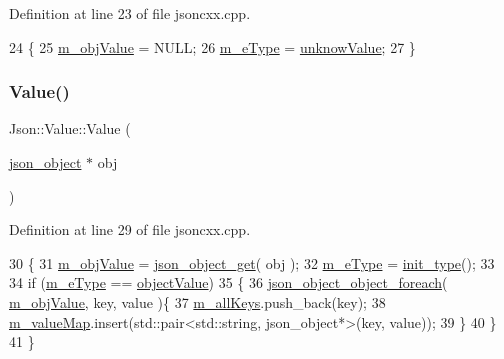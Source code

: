 Definition at line 23 of file jsoncxx.\+cpp.


\begin{DoxyCode}
24     \{
25         \hyperlink{class_json_1_1_value_a3a705e06c2dbc4a6e142b58b0cbca57e}{m\_objValue} = NULL;
26         \hyperlink{class_json_1_1_value_ae6116e08a5c1833f858c1d29156365b1}{m\_eType} = \hyperlink{namespace_json_a7d654b75c16a57007925868e38212b4eaf3bec0dbeafa6b0fdc48db16179b6369}{unknowValue};
27     \}
\end{DoxyCode}
\mbox{\label{class_json_1_1_value_ad1deffd768f7603cc7d4c5eccf03916d}} 
\subsubsection{\texorpdfstring{Value()}{Value()}\hspace{0.1cm}{\footnotesize\ttfamily [2/2]}}
{\footnotesize\ttfamily Json\+::\+Value\+::\+Value (\begin{DoxyParamCaption}\item[{\hyperlink{structjson__object}{json\+\_\+object} $\ast$}]{obj }\end{DoxyParamCaption})}



Definition at line 29 of file jsoncxx.\+cpp.


\begin{DoxyCode}
30     \{
31         \hyperlink{class_json_1_1_value_a3a705e06c2dbc4a6e142b58b0cbca57e}{m\_objValue} = \hyperlink{json__object_8c_ac09dff4e88b4d925c272b3b5061c0182}{json\_object\_get}( obj );
32         \hyperlink{class_json_1_1_value_ae6116e08a5c1833f858c1d29156365b1}{m\_eType} = \hyperlink{class_json_1_1_value_ad24bf765750e8ea535d28bcf981d551a}{init\_type}();
33 
34         \textcolor{keywordflow}{if} (\hyperlink{class_json_1_1_value_ae6116e08a5c1833f858c1d29156365b1}{m\_eType} == \hyperlink{namespace_json_a7d654b75c16a57007925868e38212b4eae8386dcfc36d1ae897745f7b4f77a1f6}{objectValue})
35         \{
36             \hyperlink{json__object_8h_acf5f514a9e0061c10fc08055762639ee}{json\_object\_object\_foreach}( \hyperlink{class_json_1_1_value_a3a705e06c2dbc4a6e142b58b0cbca57e}{m\_objValue}, key, value )\{
37                 \hyperlink{class_json_1_1_value_a914e4896d12ffa87726125d2f60ea9c0}{m\_allKeys}.push\_back(key);
38                 \hyperlink{class_json_1_1_value_a2b9203575d8ff75f02d30e09befb1204}{m\_valueMap}.insert(std::pair<std::string, json\_object*>(key, value));
39             \}
40         \}
41     \}
\end{DoxyCode}
\mbox{\label{class_json_1_1_value_a287dea48da3912d02756735bf677b27b}} 
